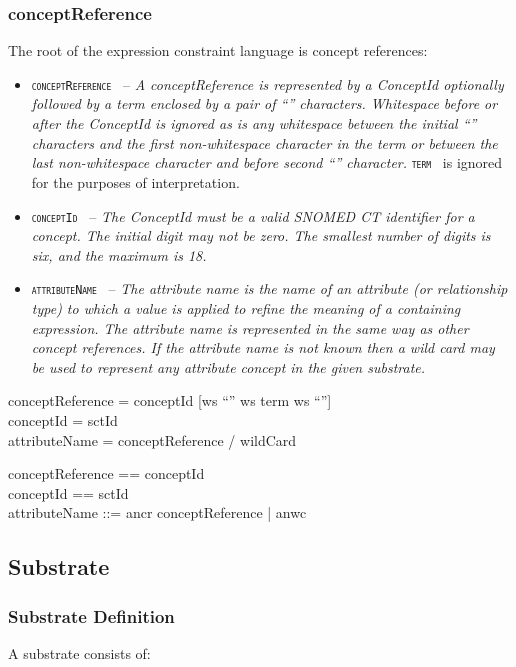 \documentclass{article}
\def\spec#1{{\tt \small \textsc{{#1}} }}
\def\bnf#1{{\scriptsize {{#1}} }}
\def\desc#1{{\small \textsl{{#1}} }}
\begin{document}
\subsubsection{conceptReference}
The root of the expression constraint language is concept references:
\begin{itemize}
\item \spec{conceptReference} -- \desc{A conceptReference is represented by a ConceptId optionally followed by a term enclosed by a pair of ``\textbar'' characters. Whitespace before or after the ConceptId is ignored as is any whitespace between the initial ``\textbar'' characters and the first non-whitespace character in the term or between the last non-whitespace character and before second ``\textbar'' character.} \spec{term} is ignored for the purposes of interpretation.  
\item \spec{conceptId} -- \desc{The ConceptId must be a valid SNOMED CT identifier for a concept. The initial digit may not be zero. The smallest number of digits is six, and the maximum is 18.}
\item \spec{attributeName} -- \desc{The attribute name is the name of an attribute (or relationship type) to which a value is applied to refine the meaning of a containing expression. The attribute name is represented in the same way as other concept references. If the attribute name is not known then a wild card may be used to represent any attribute concept in the given substrate.}
\end{itemize}
\begin{framed}
\noindent
\bnf{conceptReference = conceptId [ws ``\textbar'' ws term ws ``\textbar'']} \\
\bnf{conceptId = sctId} \\
\bnf{attributeName = conceptReference / wildCard}
\end{framed}

\begin{zed}
conceptReference == conceptId \cross \optional[term] \\
conceptId == sctId \\
attributeName ::= ancr \ldata conceptReference \rdata | anwc
\end{zed}

\subsection{Substrate}
\subsubsection{Substrate Definition}
A substrate consists of:
\end{document}
